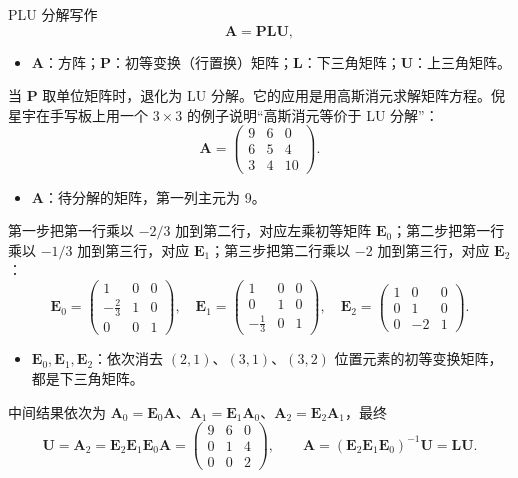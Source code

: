 \documentclass[a4paper]{article}
\begin{document}
PLU 分解写作
\[
\boldsymbol A=\boldsymbol P\boldsymbol L\boldsymbol U ,
\]
\begin{itemize}
\item $\boldsymbol A$：方阵；$\boldsymbol P$：初等变换（行置换）矩阵；$\boldsymbol L$：下三角矩阵；$\boldsymbol U$：上三角矩阵。
\end{itemize}
当 $\boldsymbol P$ 取单位矩阵时，退化为 LU 分解。它的应用是用高斯消元求解矩阵方程。倪星宇在手写板上用一个 $3\times3$ 的例子说明“高斯消元等价于 LU 分解”：
\[
\boldsymbol A=\begin{pmatrix}9&6&0\\6&5&4\\3&4&10\end{pmatrix}.
\]
\begin{itemize}
\item $\boldsymbol A$：待分解的矩阵，第一列主元为 9。
\end{itemize}
第一步把第一行乘以 $-2/3$ 加到第二行，对应左乘初等矩阵 $\boldsymbol E_0$；第二步把第一行乘以 $-1/3$ 加到第三行，对应 $\boldsymbol E_1$；第三步把第二行乘以 $-2$ 加到第三行，对应 $\boldsymbol E_2$：
\[
\boldsymbol E_0=\begin{pmatrix}1&0&0\\-\tfrac23&1&0\\0&0&1\end{pmatrix},\quad
\boldsymbol E_1=\begin{pmatrix}1&0&0\\0&1&0\\-\tfrac13&0&1\end{pmatrix},\quad
\boldsymbol E_2=\begin{pmatrix}1&0&0\\0&1&0\\0&-2&1\end{pmatrix}.
\]
\begin{itemize}
\item $\boldsymbol E_0,\boldsymbol E_1,\boldsymbol E_2$：依次消去 $(2,1)$、$(3,1)$、$(3,2)$ 位置元素的初等变换矩阵，都是下三角矩阵。
\end{itemize}
中间结果依次为 $\boldsymbol A_0=\boldsymbol E_0\boldsymbol A$、$\boldsymbol A_1=\boldsymbol E_1\boldsymbol A_0$、$\boldsymbol A_2=\boldsymbol E_2\boldsymbol A_1$，最终
\[
\boldsymbol U=\boldsymbol A_2=\boldsymbol E_2\boldsymbol E_1\boldsymbol E_0\boldsymbol A=\begin{pmatrix}9&6&0\\0&1&4\\0&0&2\end{pmatrix},
\qquad
\boldsymbol A=(\boldsymbol E_2\boldsymbol E_1\boldsymbol E_0)^{-1}\boldsymbol U=\boldsymbol L\boldsymbol U .
\]
\end{document}
